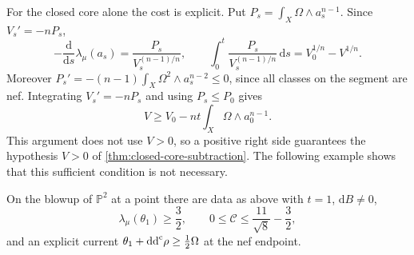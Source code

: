 For the closed core alone the cost is explicit. Put $P_s=\int_X\Omega\wedge a_s^{n-1}$. Since $V_s'=-nP_s$,
\[
 -\frac{\mathrm{d}}{\mathrm{d}s}\lambda_\mu(a_s)
       =\frac{P_s}{V_s^{(n-1)/n}},\qquad
 \int_0^t\frac{P_s}{V_s^{(n-1)/n}}\,\mathrm{d}s=V_0^{1/n}-V^{1/n}.
\]
Moreover $P_s'=-(n-1)\int_X\Omega^2\wedge a_s^{n-2}\leq0$, since all classes on the segment are nef. Integrating $V_s'=-nP_s$ and using $P_s\leq P_0$ gives
\begin{equation}\label{eq:closed-core-nef-morse}
 V\geq V_0-nt\int_X\Omega\wedge a_0^{n-1}.
\end{equation}
This argument does not use $V>0$, so a positive right side guarantees the hypothesis $V>0$ of \cref{thm:closed-core-subtraction}. The following example shows that this sufficient condition is not necessary.

\begin{example}\label{ex:nonclosed-nef-subtraction}
On the blowup of $\mathbb P^2$ at a point there are data as above with $t=1$, $\mathrm{d}B\neq0$,
\[
 \lambda_\mu(\theta_1)\geq\frac32,\qquad
 0\leq\mathcal C\leq\frac{11}{\sqrt8}-\frac32,
\]
and an explicit current $\theta_1+\mathrm{dd}^{\mathrm{c}}\rho\geq\frac12\Omega$ at the nef endpoint.
\end{example}
